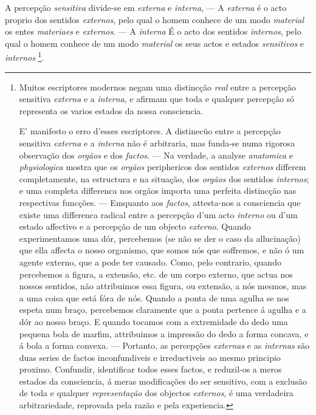 
A percepção \emph{sensitiva} divide-se em \emph{externa} e \emph{interna}, --- A \emph{externa} é o acto proprio dos sentidos \emph{externos}, pelo qual o homem conhece de um modo    \emph{material} os entes \emph{materiaes} e \emph{externos}. --- A \emph{interna} É o acto dos sentidos \emph{internos}, pelo qual o homem conhece de um modo \emph{material} os seus actos e estados \emph{sensitivos} e \emph{internos} \footnote{Muitos escriptores modernos negam uma distincção \emph{real} entre a percepção sensitiva \emph{externa} e a \emph{interna}, e afirmam que toda e qualquer percepção só representa os varios estados da nossa consciencia.\par E' manifesto o erro d'esses escriptores. A distinecüo entre a percepção sensitiva \emph{externa} e a \emph{interna} não é arbitraria, mas funda-se numa rigorosa observação dos \emph{orgãos} e dos \emph{factos}. --- Na verdade, a analyse \emph{anatomica} e \emph{physiologica} mostra que os \emph{orgãos} periphericos dos sentidos \emph{externos} differem completamente, na estructura e na situação, dos \emph{orgãos} dos sentidos \emph{internos}; e uma completa differenca nos orgãos importa uma perfeita distincção nas respectivas funcções. --- Emquanto aos \emph{factos}, attesta-nos a consciencia que existe uma differenca radical entre a percepção d'um acto \emph{interno} ou d'um estado affectivo e a percepção de um objecto \emph{externo}. Quando experimentamos uma dór, percebemos (se não se der o caso da allucinação) que ella affecta o nosso organismo, que somos nós que soffremos, e não ó um agente externo, que a pode ter causado. Como, pelo contrario, quando percebemos a figura, a extensão, etc. de um corpo externo, que actua nos nossos sentidos, não attribuimos essa figura, ou extensão, a nós mesmos, mas a uma coisa que está fóra de nós. Quando a ponta de uma agulha se nos espeta num braço, percebemos claramente que a ponta pertence á agulha e a dór ao nosso braço. E quando tocamos com a extremidade do dedo uma pequena bola de marfim, attribuimos a impressão do dedo a forma concava, e á bola a forma convexa. --- Portanto, as percepções \emph{externas} e as \emph{internas} são duas series de factos inconfundiveis e irreductiveis ao mesmo principio proximo. Confundir, identificar todos esses factos, e reduzil-os a meros estados da consciencia, á meras modificações do ser sensitivo, com a exclusão \textbar{} de toda e qualquer \emph{representação} dos objectos \emph{externos}, é uma verdadeira \textbar{} arbitrariedade, reprovada pela razão e pela experiencia.}.

